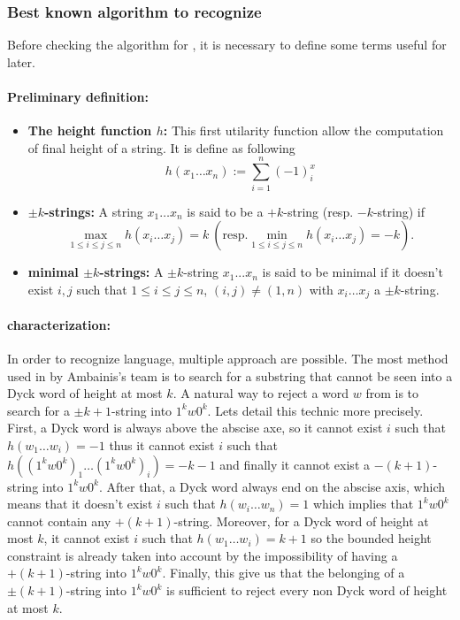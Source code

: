 \subsubsection{Best known algorithm to recognize }
\label{already_known}

Before checking the algorithm for , it is necessary to define some terms useful
for later.

\paragraph*{\textbf{Preliminary definition:}}

\begin{itemize}
    \item \textbf{The height function $h$:} This first utilarity function
          allow the computation of final height of a string. It is define as following
          \[h(x_1\ldots x_n) := \sum_{i=1}^n(-1)^x_i\]
    \item \textbf{$\pm k$-strings:} A string $x_1\ldots x_n$ is said to be a $+k$-string
          (resp. $-k$-string) if
          \[\max_{1\leq i\leq j \leq n} h(x_i \ldots x_j) = k\ \left(\textrm{resp.} \min_{1\leq i\leq j \leq n} h(x_i \ldots x_j) = -k\right).\]
    \item \textbf{minimal $\pm k$-strings:} A $\pm k$-string $x_1...x_n$ is said to be minimal
          if it doesn't exist $i, j$ such that $1 \leq i\leq j\leq n$, $(i, j) \neq (1, n)$
          with $x_i\ldots x_j$ a $\pm k$-string.
\end{itemize}

\paragraph*{\textbf{ characterization:}}
In order to recognize  language, multiple approach are possible.
The most method used in \cite{art:2DGrid} by Ambainis's team is to search
for a substring that cannot be seen into a Dyck word of height at most $k$.
A natural way to reject a word $w$ from  is to search for a $\pm k+1$-string
into $1^k w0^k$. Lets detail this technic more precisely. First, a Dyck word
is always above the abscise axe, so it cannot exist $i$ such that $h(w_1 \ldots w_i)=-1$
thus it cannot exist $i$ such that $h((1^k w0^k)_1 \ldots (1^k w0^k)_i)=-k-1$ and finally
it cannot exist a $-(k+1)$-string into $1^k w0^k$. After that, a Dyck word always end on
the abscise axis, which means that it doesn't exist $i$ such that $h(w_i \ldots w_n)=1$
which implies that $1^k w0^k$ cannot contain any $+(k+1)$-string. Moreover, for a Dyck word
of height at most $k$, it cannot exist $i$ such that $h(w_1\ldots w_i) = k+1$ so the
bounded height constraint is already taken into account by the impossibility of having a
$+(k+1)$-string into $1^k w0^k$. Finally, this give us that the belonging of a $\pm(k+1)$-string
into $1^k w0^k$ is sufficient to reject every non Dyck word of height at most $k$.

